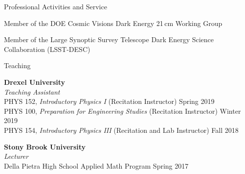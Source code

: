 \documentclass{resume} %
\newcommand{\forceindent}{\leavevmode{\parindent=1em\indent}}
\begin{document}

\begin{rSection}{Professional Activities and Service}

\begin{description}[leftmargin=10em, style=nextline]

\item[Working Groups] Member of the DOE Cosmic Visions Dark Energy 21$\,$cm Working 
 Group

\item[Collaborations] Member of the Large Synoptic Survey Telescope Dark Energy 
 Science Collaboration (LSST-DESC)

\end{description}

\end{rSection}


\begin{rSection}{Teaching}

\textbf{Drexel University} \\ 
\textit{Teaching Assistant}\\
\forceindent PHYS 152, \textit{Introductory Physics I} (Recitation Instructor) \hfill {Spring 2019}\\
\forceindent PHYS 100, \textit{Preparation for Engineering Studies} (Recitation Instructor) \hfill {Winter 2019}\\
\forceindent PHYS 154, \textit{Introductory Physics III} (Recitation and Lab Instructor) \hfill {Fall 2018}



\textbf{Stony Brook University} \\
\textit{Lecturer}\\
\forceindent  Della Pietra High School Applied Math Program \hfill {Spring 2017}

\end{rSection}

\end{document}
